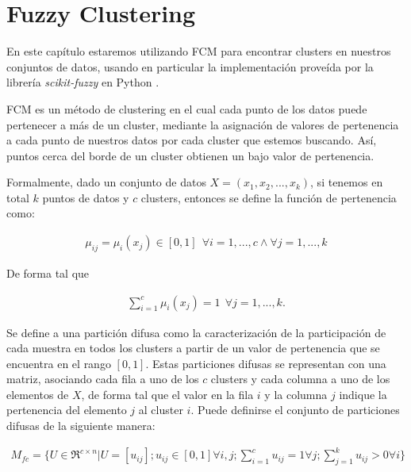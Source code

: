 \chapter{Fuzzy Clustering}
\label{chapter:fuzzy}

En este capítulo estaremos utilizando \gls{FCM} para encontrar clusters en nuestros conjuntos de datos, usando en particular la implementación proveída por la librería \textit{scikit-fuzzy} en Python \citep{2020SciPy-NMeth}.

\gls{FCM} es un método de clustering en el cual cada punto de los datos puede pertenecer a más de un cluster, mediante la asignación de valores de pertenencia a cada punto de nuestros datos por cada cluster que estemos buscando. Así, puntos cerca del borde de un cluster obtienen un bajo valor de pertenencia.

Formalmente, dado un conjunto de datos $X = (x_1, x_2,..., x_k)$, si tenemos en total $k$ puntos de datos y $c$ clusters, entonces se define la función de pertenencia como:

\begin{equation}
    \begin{aligned}
        \mu_{ij} = \mu_i(x_j) \in [0, 1] \ \ \forall i = 1,...,c \land \forall j = 1,...,k
    \end{aligned}
\end{equation} 

De forma tal que

\begin{equation}
    \begin{aligned}
        \sum_{i=1}^{c} \mu_i(x_j) = 1 \ \ \forall j = 1,...,k.
    \end{aligned}
\end{equation} 

Se define a una partición difusa como la caracterización de la participación de cada muestra en todos los clusters a partir de un valor de pertenencia que se encuentra en el rango $[0, 1]$. Estas particiones difusas se representan con una matriz, asociando cada fila a uno de los $c$ clusters y cada columna a uno de los elementos de $X$, de forma tal que el valor en la fila $i$ y la columna $j$ indique la pertenencia del elemento $j$ al cluster $i$. Puede definirse el conjunto de particiones difusas de la siguiente manera:

\begin{equation}
    \begin{aligned}
        M_{fc} = \{U \in \Re^{c \times n} | U = [u_{ij}];u_{ij} \in [0, 1] \forall i, j; \sum_{i=1}^{c} u_{ij} = 1  \forall j; \sum_{j=1}^{k} u_{ij} > 0  \forall i \}
    \end{aligned}
\end{equation}

